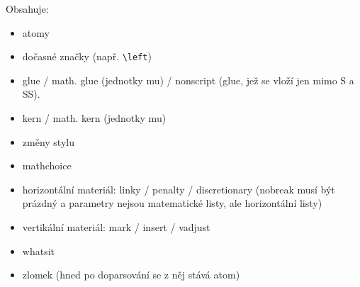 \documentclass[12pt]{article}					%
\begin{document}
    \begin{definice}
        Obsahuje:
        \begin{itemize}
            \item atomy
            \item dočasné značky (např. \verb|\left|)
            \item glue / math. glue (jednotky mu) / nonscript (glue, jež se vloží jen mimo S a SS).
            \item kern / math. kern (jednotky mu)
            \item změny stylu
            \item mathchoice
            \item horizontální materiál: linky / penalty / discretionary (nobreak musí být prázdný a parametry nejsou matematické listy, ale horizontální listy)
            \item vertikální materiál: mark / insert / vadjust
            \item whatsit
            \item zlomek (hned po doparsování se z něj stává atom)
        \end{itemize}
    \end{definice}
\end{document}
